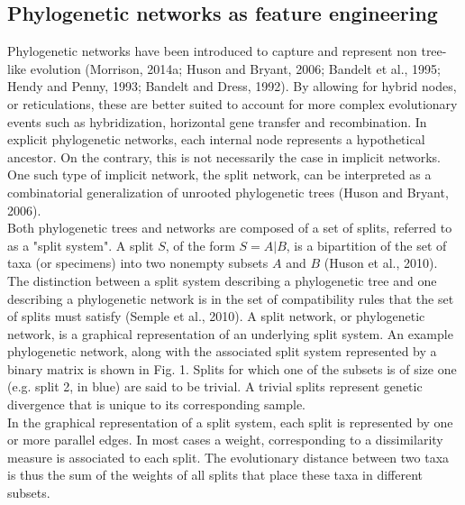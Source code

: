 \documentclass[final]{bioinfo}
\begin{document}
\subsection{Phylogenetic networks as feature engineering}
Phylogenetic networks have been introduced to capture and represent non tree-like evolution (Morrison, 2014a; Huson and Bryant, 2006; Bandelt et al., 1995; Hendy and Penny, 1993; Bandelt and Dress, 1992). By allowing for hybrid nodes, or reticulations, these are better suited to account for more complex evolutionary events such as hybridization, horizontal gene transfer and recombination. In explicit phylogenetic networks, each internal node represents a hypothetical ancestor. On the contrary, this is not necessarily the case in implicit networks.  One such type of implicit network, the split network, can be interpreted as a combinatorial generalization of unrooted phylogenetic trees (Huson and Bryant, 2006).\\
Both phylogenetic trees and networks are composed of a set of splits, referred to as a "split system". A split $S$, of the form $S = A|B$, is a bipartition of the set of taxa (or specimens) into two nonempty subsets $A$ and $B$ (Huson et al., 2010). The distinction between a split system describing a phylogenetic tree and one describing a phylogenetic network is in the set of compatibility rules that the set of splits must satisfy (Semple et al., 2010). A split network, or phylogenetic network, is a graphical representation of an underlying split system. An example phylogenetic network, along with the associated split system represented by a binary matrix is shown in Fig. 1. Splits for which one of the subsets is of size one (e.g. split 2, in blue) are said to be trivial. A trivial splits represent genetic divergence that is unique to its corresponding sample.\\
In the graphical representation of a split system, each split is represented by one or more parallel edges. In most cases a weight, corresponding to a dissimilarity measure is associated to each split. The evolutionary distance between two taxa is thus the sum of the weights of all splits that place these taxa in different subsets.
\end{document}
